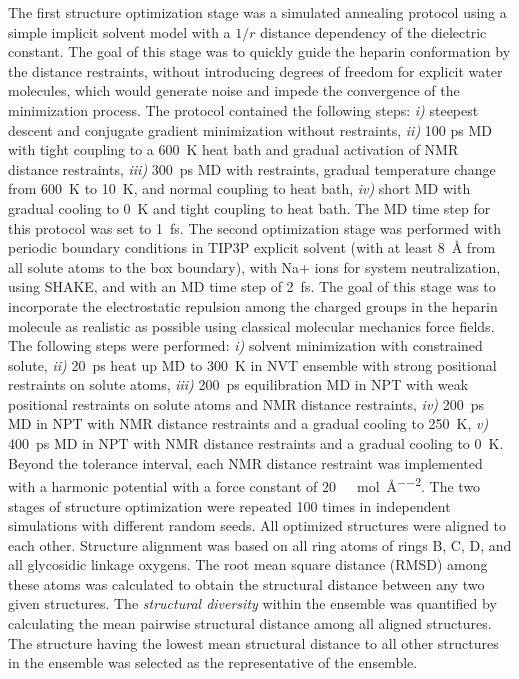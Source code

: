 The first structure optimization stage was a simulated annealing protocol using
a simple implicit solvent model with a $1/r$ distance dependency of the
dielectric constant. The goal of this stage was to quickly guide the heparin
conformation by the distance restraints, without introducing degrees of freedom
for explicit water molecules, which would generate noise and impede the
convergence of the minimization process. The protocol contained the following
steps: \textit{i)} steepest descent and conjugate gradient minimization without
restraints, \textit{ii)} 100 ps MD with tight coupling to a \SI{600}{\kelvin}
heat bath and gradual activation of NMR distance restraints, \textit{iii)}
\SI{300}{\pico\second} MD with restraints, gradual temperature change from
\SI{600}{\kelvin} to \SI{10}{\kelvin}, and normal coupling to heat bath,
\textit{iv)} short MD with gradual cooling to \SI{0}{\kelvin} and tight coupling
to heat bath. The MD time step for this protocol was set to
\SI{1}{\femto\second}. The second optimization stage was performed with periodic
boundary conditions in TIP3P explicit solvent (with at least \SI{8}{\angstrom}
from all solute atoms to the box boundary), with Na+ ions for system
neutralization, using SHAKE, and with an MD time step of \SI{2}{\femto\second}.
The goal of this stage was to incorporate the electrostatic repulsion among the
charged groups in the heparin molecule as realistic as possible using classical
molecular mechanics force fields. The following steps were performed:
\textit{i)} solvent minimization with constrained solute, \textit{ii)}
\SI{20}{\pico\second} heat up MD to \SI{300}{\kelvin} in NVT ensemble with
strong positional restraints on solute atoms, \textit{iii)}
\SI{200}{\pico\second} equilibration MD in NPT with weak positional restraints
on solute atoms and NMR distance restraints, \textit{iv)}
\SI{200}{\pico\second} MD in NPT with NMR distance restraints and a gradual
cooling to \SI{250}{\kelvin}, \textit{v)} \SI{400}{\pico\second} MD in NPT with
NMR distance restraints and a gradual cooling to \SI{0}{\kelvin}. Beyond the
tolerance interval, each NMR distance restraint was implemented with a harmonic
potential with a force constant of
\SI{20}{\kilo\calory\per\mole\per\angstrom\squared}. The two stages of structure
optimization were repeated 100 times in independent simulations with different
random seeds. All optimized structures were aligned to each other. Structure
alignment was based on all ring atoms of rings B, C, D, and all glycosidic
linkage oxygens. The root mean square distance (RMSD) among these atoms was
calculated to obtain the structural distance between any two given structures.
The \textit{structural diversity} within the ensemble was quantified by
calculating the mean pairwise structural distance among all aligned structures.
The structure having the lowest mean structural distance to all other structures
in the ensemble was selected as the representative of the ensemble.


